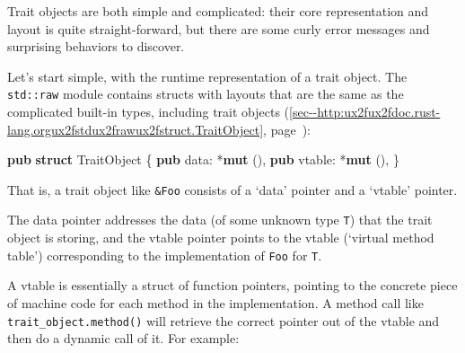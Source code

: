 \documentclass[a4paper,]{book}
\renewcommand*{\hyperref}[2][\ar]{%
  \def\ar{#2}%
  #2 (\autoref{#1}, page~\pageref{#1})}
\newenvironment{Shaded}{\begin{snugshade}}{\end{snugshade}}
\newcommand{\KeywordTok}[1]{\textcolor[rgb]{0.13,0.29,0.53}{\textbf{{#1}}}}
\newcommand{\NormalTok}[1]{{#1}}
\begin{document}
Trait objects are both simple and complicated: their core representation
and layout is quite straight-forward, but there are some curly error
messages and surprising behaviors to discover.

Let's start simple, with the runtime representation of a trait object.
The \texttt{std::raw} module contains structs with layouts that are the
same as the complicated built-in types,
\hyperref[sec--http:ux2fux2fdoc.rust-lang.orgux2fstdux2frawux2fstruct.TraitObject]{including
trait objects}:

\begin{Shaded}
\begin{Highlighting}[]
\KeywordTok{pub} \KeywordTok{struct} \NormalTok{TraitObject \{}
    \KeywordTok{pub} \NormalTok{data: *}\KeywordTok{mut} \NormalTok{(),}
    \KeywordTok{pub} \NormalTok{vtable: *}\KeywordTok{mut} \NormalTok{(),}
\NormalTok{\}}
\end{Highlighting}
\end{Shaded}

That is, a trait object like \texttt{\&Foo} consists of a `data' pointer
and a `vtable' pointer.

The data pointer addresses the data (of some unknown type \texttt{T})
that the trait object is storing, and the vtable pointer points to the
vtable (`virtual method table') corresponding to the implementation of
\texttt{Foo} for \texttt{T}.

A vtable is essentially a struct of function pointers, pointing to the
concrete piece of machine code for each method in the implementation. A
method call like \texttt{trait\_object.method()} will retrieve the
correct pointer out of the vtable and then do a dynamic call of it. For
example:
\end{document}
